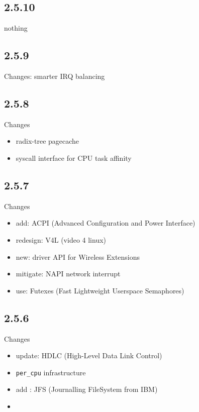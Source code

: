 \subsection{2.5.10}

nothing

\subsection{2.5.9}

Changes: smarter IRQ balancing	

\subsection{2.5.8}

Changes
\begin{itemize}
  \item radix-tree pagecache
  
  \item syscall interface for CPU task affinity
\end{itemize}

\subsection{2.5.7}

Changes
\begin{itemize}
  \item add: ACPI (Advanced Configuration and Power Interface)
  
  \item redesign: V4L (video 4 linux)
  \item new: driver API for Wireless Extensions
  \item mitigate: NAPI network interrupt
  \item use: Futexes (Fast Lightweight Userspace Semaphores) 
\end{itemize}

\subsection{2.5.6}

Changes
\begin{itemize}
  \item update: HDLC (High-Level Data Link Control)
  
  \item \verb!per_cpu! infrastructure
  \item add : JFS (Journalling FileSystem from IBM)
  
  \item 
\end{itemize}

